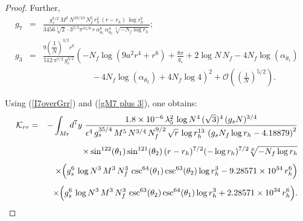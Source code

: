 \documentclass[a4paper,11pt,fleqn]{article}
\theoremstyle{plain}
\theoremstyle{definition}
\newcommand{\rh}{r_h}
\newcommand{\logN}{\log N}
\newcommand{\gsNf}{g_s N_f}
\newcommand{\logrh}{\log r_h}
\begin{document}
\begin{proof}
%
Further,
\begin{eqnarray}
\label{gM7 plus 3}
g_7 &=& \frac{g_s^{7/2}\,M^2\,N^{19/10}\,N_f^5\,\rh^2\,
              (r-\rh)\,\logrh^7}
             {3456\sqrt[3]{2}\cdot 3^{2/3}\pi^{31/6}\,r\,
              \alpha_{\theta_1}^6\,\alpha_{\theta_2}^4\,
              \sqrt[3]{-N_f\logrh}};
\nonumber\\[6pt]
g_3 &=& \frac{9\left(\dfrac{1}{N}\right)^{3/2} r^6}
             {512\,\pi^{7/2}\,g_s^{3/2}}
        \left(-N_f\log\!\left(9a^2 r^4+r^6\right)
              +\frac{8\pi}{g_s}
              +2\logN\,N_f
              -4N_f\log\!\left(\alpha_{\theta_1}\right)\right.
\nonumber\\[4pt]
&&\qquad\qquad\qquad\left.
              -\,4N_f\log\!\left(\alpha_{\theta_2}\right)
              +4N_f\log 4
        \right)^2
        +\mathcal{O}\!\left(\left(\frac{1}{N}\right)^{5/2}\right).
\end{eqnarray}

Using (\ref{I7overGrr}) and (\ref{gM7 plus 3}), one obtains:
%
\begin{eqnarray}
\label{Krr}
\mathcal{K}_{rr}
&=& -\int_{M_7}\!d^7y\;
    \frac{1.8\times10^{-6}\,\lambda_5^2\,\logN^4\,(\sqrt{3})^4\,
          (g_s N)^{3/4}}
         {\epsilon^4\,g_s^{35/4}\,M^5\,N^{3/4}\,N_f^{9/2}\,
          \sqrt{r}\,\logrh^{13}\,
          \left(\gsNf\logrh - 4.18879\right)^2}
\nonumber\\[4pt]
&& \times
   \sin^{122}\!\left(\theta_1\right)\sin^{121}\!\left(\theta_2\right)
   (r-\rh)^{7/2}(-\logrh)^{7/2}
   \sqrt[6]{-N_f\logrh}
\nonumber\\[4pt]
&& \times
   \Bigl(g_s^6\,\logN^3\,M^3\,N_f^3\,
         \csc^{64}\!\left(\theta_1\right)\csc^{63}\!\left(\theta_2\right)\logrh^3
         - 9.28571\times10^{34}\,\rh^6\Bigr)
\nonumber\\[4pt]
&& \times
   \Bigl(g_s^6\,\logN^3\,M^3\,N_f^3\,
         \csc^{63}\!\left(\theta_2\right)\csc^{64}\!\left(\theta_1\right)\logrh^3
         + 2.28571\times10^{34}\,\rh^6\Bigr).
\end{eqnarray}


\end{proof}
\end{document}
